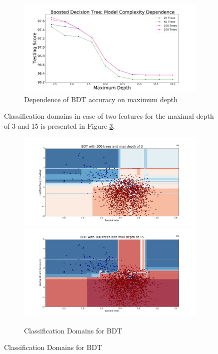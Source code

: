 \begin{figure}[h]
\begin{figure}[h]
\includegraphics[width=\twopicsp\textwidth]{plots/bdt_assoc_depth.pdf}
\caption{Dependence of BDT accuracy on maximum depth}
\label{fig:BDT_depth}
\end{figure}

Classification domains in case of two features for the maximal depth of 3 and 15 is presented in Figure \ref{fig:BDT_domains}.

\begin{figure}[h]
\includegraphics[width=\twopicsp\textwidth]{plots/classdom_bdt_100_3.pdf}
\includegraphics[width=\twopicsp\textwidth]{plots/classdom_bdt_100_15.pdf}
\caption{Classification Domains for BDT}
\label{fig:BDT_domains}
\end{figure}



\end{figure}
